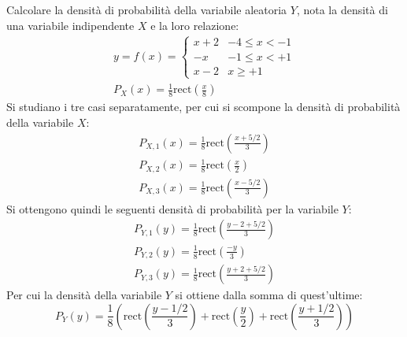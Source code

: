 \documentclass{article}
\newcommand{\rect}{\mathrm{rect}}
\begin{document}
Calcolare la densità di probabilità della variabile aleatoria $Y$, nota la densità di una variabile indipendente $X$ e la loro relazione:
\begin{gather*}
    y=f(x)=\begin{cases}
        x+2&-4\leq x<-1\\
        -x&-1\leq x<+1\\
        x-2&x\geq +1
    \end{cases}\\
    P_X(x)=\displaystyle\frac{1}{8}\rect\left(\frac{x}{8}\right)
\end{gather*}
Si studiano i tre casi separatamente, per cui si scompone la densità di probabilità della variabile $X$:
\begin{gather*}
    P_{X,1}(x)=\displaystyle\frac{1}{8}\rect\left(\frac{x+5/2}{3}\right)\\
    P_{X,2}(x)=\displaystyle\frac{1}{8}\rect\left(\frac{x}{2}\right)\\
    P_{X,3}(x)=\displaystyle\frac{1}{8}\rect\left(\frac{x-5/2}{3}\right)
\end{gather*}
Si ottengono quindi le seguenti densità di probabilità per la variabile $Y$:
\begin{gather*}
    P_{Y,1}(y)=\displaystyle\frac{1}{8}\rect\left(\frac{y-2+5/2}{3}\right)\\
    P_{Y,2}(y)=\displaystyle\frac{1}{8}\rect\left(\frac{-y}{3}\right)\\
    P_{Y,3}(y)=\displaystyle\frac{1}{8}\rect\left(\frac{y+2+5/2}{3}\right)
\end{gather*}
Per cui la densità della variabile $Y$ si ottiene dalla somma di quest'ultime:
\begin{equation}
    P_Y(y)=\displaystyle\frac{1}{8}\left(\rect\left(\frac{y-1/2}{3}\right)+\rect\left(\frac{y}{2}\right)+\rect\left(\frac{y+1/2}{3}\right)\right)
\end{equation}
\end{document}
